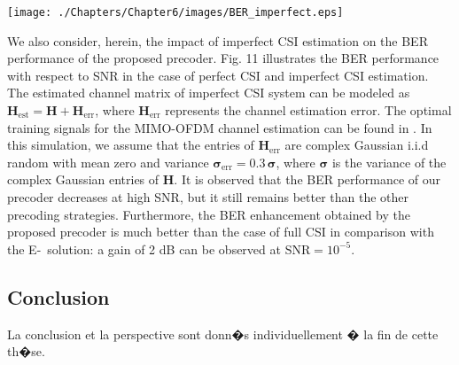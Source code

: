 \begin{center}
\texttt{[image: ./Chapters/Chapter6/images/BER\_imperfect.eps]}
\end{center}
We also consider, herein, the impact of imperfect CSI estimation on the BER performance of the proposed precoder. Fig. 11 illustrates the BER performance with respect to SNR in the case of perfect CSI and imperfect CSI estimation. The estimated channel matrix of imperfect CSI system can be modeled as $\mathbf{H}_ \text{est} = \mathbf{H} + \mathbf{H}_\text{err}$, where $\mathbf{H}_ \text{err}$ represents the channel estimation error. The optimal training signals for the MIMO-OFDM channel estimation can be found in \cite{minn2006optimal}. In this simulation, we assume that the entries of $\mathbf{H}_ \text{err}$ are complex Gaussian i.i.d random with mean zero and variance $\mathbf{\sigma}_ \text{err} = 0.3 \, \mathbf{\sigma}$, where $\mathbf{\sigma}$  is the variance of the complex Gaussian entries of $\mathbf{H}$. It is observed that the BER performance of our precoder decreases at high SNR, but it still remains better than the other precoding strategies. Furthermore, the BER enhancement obtained by the proposed precoder is much better than the case of full CSI in comparison with the E-\dmin\ solution: a gain of 2 dB can be observed at $\text{SNR}=10^{-5}$. 



\subsection*{Conclusion}
La conclusion et la perspective sont donn�s individuellement � la fin de cette th�se.

